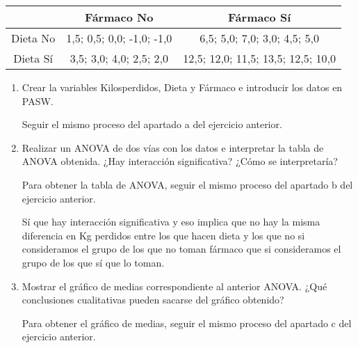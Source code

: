 \begin{enumerate}
\begin{center}

\begin{tabular}{|l|l|l|}
\cline{2-3}
\multicolumn{1}{c|}{} & \multicolumn{1}{c|}{Fármaco No} & \multicolumn{1}{c|}{Fármaco Sí} \\
\hline
\multicolumn{1}{|c|}{Dieta No} & \multicolumn{1}{c|}{1,5; 0,5; 0,0; -1,0; -1,0 } & \multicolumn{1}{c|}{6,5; 5,0; 7,0; 3,0; 4,5; 5,0} \\
\hline
\multicolumn{1}{|c|}{Dieta Sí} & \multicolumn{1}{c|}{3,5; 3,0; 4,0; 2,5; 2,0} & \multicolumn{1}{c|}{12,5; 12,0; 11,5; 13,5; 12,5; 10,0} \\
\hline
\end{tabular}

\end{center}

\begin{enumerate}

\item Crear la variables \textsf{Kilosperdidos}, \textsf{Dieta} y \textsf{Fármaco} e introducir los datos en PASW.

\begin{indicacion}{Seguir el mismo proceso del apartado a del ejercicio anterior.

}
\end{indicacion}

\item Realizar un ANOVA de dos vías con los datos e interpretar la tabla de ANOVA obtenida. ¿Hay interacción significativa? ¿Cómo se interpretaría?

\begin{indicacion}{Para obtener la tabla de ANOVA, seguir el mismo proceso del apartado b del ejercicio anterior.

Sí que hay interacción significativa y eso implica que no hay la misma diferencia en Kg perdidos entre los que hacen dieta y los que no si consideramos el grupo de los que no toman fármaco que si consideramos el grupo de los que sí que lo toman.

}
\end{indicacion}

\item Mostrar el gráfico de medias correspondiente al anterior ANOVA. ¿Qué conclusiones cualitativas pueden sacarse del gráfico obtenido?

\begin{indicacion}{Para obtener el gráfico de medias, seguir el mismo proceso del apartado c del ejercicio anterior.

}
\end{indicacion}
\end{enumerate}
\end{enumerate}

